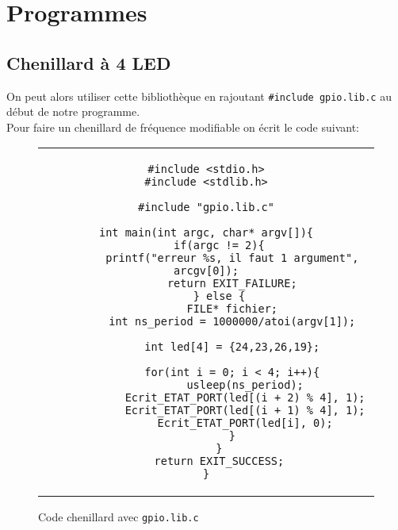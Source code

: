 \documentclass[11pt, openright]{book}
\begin{document}
\section{Programmes}

\subsection{Chenillard à 4 LED}

On peut alors utiliser cette bibliothèque en rajoutant \texttt{\#include gpio.lib.c} au début de notre programme.\\
Pour faire un chenillard de fréquence modifiable on écrit le code suivant:

\begin{figure}[ht!]
	\centering
	\begin{tabular}{c}
		\begin{lstlisting}
#include <stdio.h>
#include <stdlib.h>

#include "gpio.lib.c"

int main(int argc, char* argv[]){
    if(argc != 2){
        printf("erreur %s, il faut 1 argument", arcgv[0]);
        return EXIT_FAILURE;
    } else {
        FILE* fichier;
        int ns_period = 1000000/atoi(argv[1]);

        int led[4] = {24,23,26,19};
        
        for(int i = 0; i < 4; i++){
            usleep(ns_period);
            Ecrit_ETAT_PORT(led[(i + 2) % 4], 1);
            Ecrit_ETAT_PORT(led[(i + 1) % 4], 1);
            Ecrit_ETAT_PORT(led[i], 0);
        }
    }
    return EXIT_SUCCESS;
}
				\end{lstlisting}
	\end{tabular}
	\caption{Code chenillard avec \texttt{gpio.lib.c}}
\end{figure}
\end{document}

